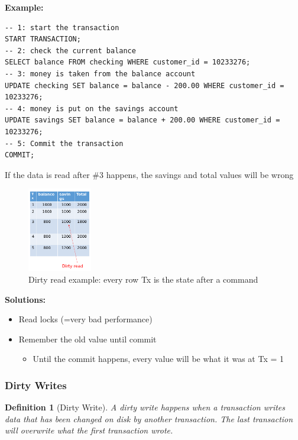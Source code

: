 \documentclass{article}
\newtheorem{theorem}{Definition}[section]
\begin{document}
\textbf{Example: } 

\begin{verbatim}
-- 1: start the transaction
START TRANSACTION;
-- 2: check the current balance
SELECT balance FROM checking WHERE customer_id = 10233276;
-- 3: money is taken from the balance account
UPDATE checking SET balance = balance - 200.00 WHERE customer_id = 10233276;
-- 4: money is put on the savings account
UPDATE savings SET balance = balance + 200.00 WHERE customer_id = 10233276;
-- 5: Commit the transaction
COMMIT;
\end{verbatim}

If the data is read after \#3 happens, the savings and total values will be wrong

\begin{figure}[H]
    \centering
    \includegraphics[width=0.25\textwidth]{dirty-reads.png}
    \caption{Dirty read example: every row Tx is the state after a command}
\end{figure}
 

\textbf{Solutions:}

\begin{itemize}
    \item Read locks (=very bad performance)
    \item Remember the old value until commit
    \begin{itemize}
        \item Until the commit happens, every value will be what it was at Tx = 1
    \end{itemize}
\end{itemize}

\subsubsection{Dirty Writes}

\begin{theorem}[Dirty Write]
A dirty write happens when a transaction writes data that has been changed on disk by another transaction. 
The last transaction will overwrite what the first transaction wrote.
\end{theorem}
\end{document}
